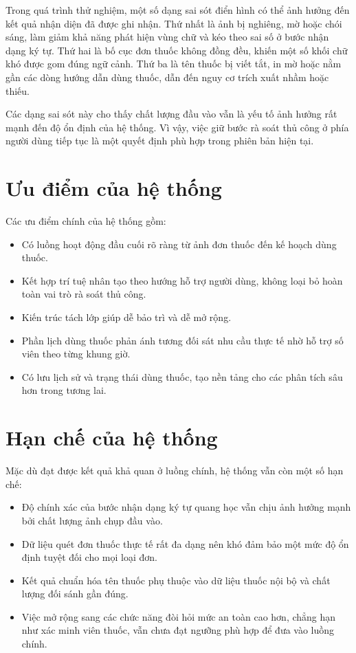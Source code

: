 \documentclass[12pt,a4paper]{report}
\begin{document}
Trong quá trình thử nghiệm, một số dạng sai sót điển hình có thể ảnh hưởng đến kết quả nhận diện đã được ghi nhận. Thứ nhất là ảnh bị nghiêng, mờ hoặc chói sáng, làm giảm khả năng phát hiện vùng chữ và kéo theo sai số ở bước nhận dạng ký tự. Thứ hai là bố cục đơn thuốc không đồng đều, khiến một số khối chữ khó được gom đúng ngữ cảnh. Thứ ba là tên thuốc bị viết tắt, in mờ hoặc nằm gần các dòng hướng dẫn dùng thuốc, dẫn đến nguy cơ trích xuất nhầm hoặc thiếu.

Các dạng sai sót này cho thấy chất lượng đầu vào vẫn là yếu tố ảnh hưởng rất mạnh đến độ ổn định của hệ thống. Vì vậy, việc giữ bước rà soát thủ công ở phía người dùng tiếp tục là một quyết định phù hợp trong phiên bản hiện tại.

\section{Ưu điểm của hệ thống}

Các ưu điểm chính của hệ thống gồm:

\begin{itemize}[leftmargin=1.5cm]
    \item Có luồng hoạt động đầu cuối rõ ràng từ ảnh đơn thuốc đến kế hoạch dùng thuốc.
    \item Kết hợp trí tuệ nhân tạo theo hướng hỗ trợ người dùng, không loại bỏ hoàn toàn vai trò rà soát thủ công.
    \item Kiến trúc tách lớp giúp dễ bảo trì và dễ mở rộng.
    \item Phần lịch dùng thuốc phản ánh tương đối sát nhu cầu thực tế nhờ hỗ trợ số viên theo từng khung giờ.
    \item Có lưu lịch sử và trạng thái dùng thuốc, tạo nền tảng cho các phân tích sâu hơn trong tương lai.
\end{itemize}

\section{Hạn chế của hệ thống}

Mặc dù đạt được kết quả khả quan ở luồng chính, hệ thống vẫn còn một số hạn chế:

\begin{itemize}[leftmargin=1.5cm]
    \item Độ chính xác của bước nhận dạng ký tự quang học vẫn chịu ảnh hưởng mạnh bởi chất lượng ảnh chụp đầu vào.
    \item Dữ liệu quét đơn thuốc thực tế rất đa dạng nên khó đảm bảo một mức độ ổn định tuyệt đối cho mọi loại đơn.
    \item Kết quả chuẩn hóa tên thuốc phụ thuộc vào dữ liệu thuốc nội bộ và chất lượng đối sánh gần đúng.
    \item Việc mở rộng sang các chức năng đòi hỏi mức an toàn cao hơn, chẳng hạn như xác minh viên thuốc, vẫn chưa đạt ngưỡng phù hợp để đưa vào luồng chính.
\end{itemize}
\end{document}
